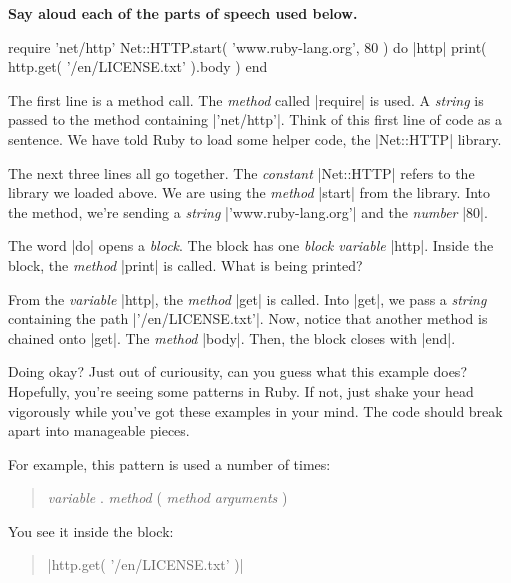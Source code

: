 \documentclass[12pt,twoside]{report}
\begin{document}
{\bf Say aloud each of the parts of speech used below.}


\begin{rubycode}

 require 'net/http'
 Net::HTTP.start( 'www.ruby-lang.org', 80 ) do |http|
   print( http.get( '/en/LICENSE.txt' ).body )
 end

\end{rubycode}


The first line is a method call.  The {\em method} called
\rubyinline|require| is used.  A {\em string} is
passed to the method containing
\rubyinline|'net/http'|.  Think of this first line of
code as a sentence.  We have told Ruby to load some helper code, the
\rubyinline|Net::HTTP| library.


The next three lines all go together.  The {\em constant}
\rubyinline|Net::HTTP| refers to the library we loaded
above. We are using the {\em method}
\rubyinline|start| from the library.  Into the method,
we're sending a {\em string}
\rubyinline|'www.ruby-lang.org'| and the {\em number}
\rubyinline|80|.

The word \rubyinline|do| opens a {\em block}.  The
block has one {\em block variable} \rubyinline|http|.
Inside the block, the {\em method} \rubyinline|print|
is called.  What is being printed?

From the {\em variable} \rubyinline|http|, the {\em
  method} \rubyinline|get| is called.  Into
\rubyinline|get|, we pass a {\em string} containing
the path \rubyinline|'/en/LICENSE.txt'|.  Now, notice
that another method is chained onto \rubyinline|get|.
The {\em method} \rubyinline|body|.  Then, the block
closes with \rubyinline|end|.

Doing okay?  Just out of curiousity, can you guess what this example
does?  Hopefully, you're seeing some patterns in Ruby.  If not, just
shake your head vigorously while you've got these examples in your
mind.  The code should break apart into manageable pieces.

\pagebreak

For example, this pattern is used a number of times:

\begin{quote}
{\em variable} . {\em method} ( {\em method arguments} )\end{quote}


You see it inside the block:

\begin{quote}
\rubyinline|http.get( '/en/LICENSE.txt' )|\end{quote}
\end{document}
